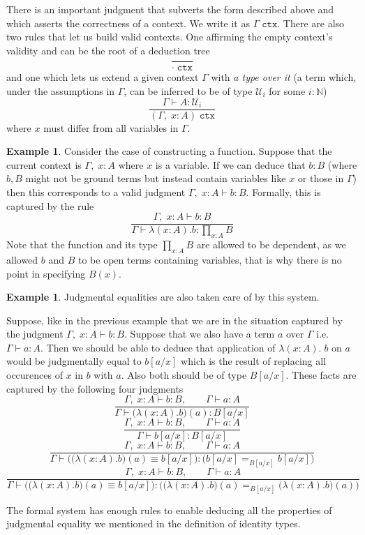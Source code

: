\documentclass[12pt]{report}
\theoremstyle{definition}
\newtheorem{exmp}[thm]{Example}
\begin{document}
There is an important judgment that subverts the form described above and which asserts the correctness of a context. 
We write it as $\Gamma\; \mathtt{ctx}$. 
There are also two rules that let us build valid contexts. 
One affirming the empty context's validity and can be the root of a deduction tree
$$\frac{~}{\cdot\; \mathtt{ctx}}$$
and one which lets us extend a given context $\Gamma$ with \textit{a type over it} (a term which, under the assumptions in $\Gamma$, can be inferred to be of type $\mathcal{U}_i$ for some $i : \mathbb{N}$)
$$\frac{\Gamma \vdash A : \mathcal{U}_i}{(\Gamma,\; x: A)\; \mathtt{ctx}}$$
where $x$ must differ from all variables in $\Gamma$. 
\begin{exmp}
Consider the case of constructing a function. 
Suppose that the current context is $\Gamma,\;x : A$ where $x$ is a variable. 
If we can deduce that $b : B$ (where $b, B$ might not be ground terms but instead contain variables like $x$ or those in $\Gamma$) then this corresponds to a valid judgment $\Gamma,\;x :A \vdash b : B$. 
Formally, this is captured by the rule
$$\frac{\Gamma,\;x : A \vdash b : B}{\Gamma \vdash \lambda(x : A).b : \prod_{x : A}B}$$
Note that the function and its type $\prod_{x : A}B$ are allowed to be dependent, as we allowed $b$ and $B$ to be open terms containing variables, that is why there is no point in specifying $B(x)$. 
\end{exmp} 
\begin{exmp}
Judgmental equalities are also taken care of by this system. 

Suppose, like in the previous example that we are in the situation captured by the judgment $\Gamma,\;x :A \vdash b : B$. Suppose that we also have a term $a$ over $\Gamma$ i.e. $\Gamma \vdash a : A$. 
Then we should be able to deduce that application of $\lambda(x : A).\;b$ on $a$ would be judgmentally equal to $b[a/x]$ which is the result of replacing all occurences of $x$ in $b$ with $a$. 
Also both should be of type $B[a/x]$. 
These facts are captured by the following four judgments
$$\frac{\Gamma,\;x : A \vdash b : B,\qquad \Gamma \vdash a : A}{\Gamma \vdash \big(\lambda(x : A).b\big)(a) : B[a/x]}$$
$$\frac{\Gamma,\;x : A \vdash b : B,\qquad \Gamma \vdash a : A}{\Gamma \vdash b[a/x] : B[a/x]}$$
$$\frac{\Gamma,\;x : A \vdash b : B,\qquad \Gamma \vdash a : A}{\Gamma \vdash \Big(\big(\lambda(x : A).b\big)(a) \equiv b[a/x]\Big) : \Big(b[a/x] =_{B[a/x]} b[a/x]\Big)}$$
$$\frac{\Gamma,\;x : A \vdash b : B,\qquad \Gamma \vdash a : A}{\Gamma \vdash \Big(\big(\lambda(x : A).b\big)(a) \equiv b[a/x]\Big) : \Big(\big(\lambda(x : A).b\big)(a) =_{B[a/x]} \big(\lambda(x : A).b\big)(a)\Big)}$$

The formal system has enough rules to enable deducing all the properties of judgmental equality we mentioned in the definition of identity types.
\end{exmp}
\end{document}
